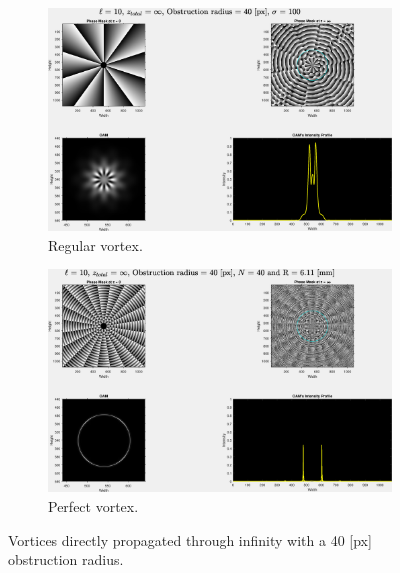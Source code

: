 \begin{figure}[htbp]
    \centering
    \begin{subfigure}[b]{0.45\textwidth}
        \centering
        \includegraphics[width=\textwidth]{images/c04/type=0_r=40_zi=0_zf=Inf.eps}
        \caption{Regular vortex.}
    \end{subfigure}
    \hfill
    \begin{subfigure}[b]{0.45\textwidth}
        \centering
        \includegraphics[width=\textwidth]{images/c04/type=1_r=40_zi=0_zf=Inf.eps}
        \caption{Perfect vortex.}
    \end{subfigure}
    \caption{Vortices directly propagated through infinity with a 40 [px] obstruction radius.}
    \label{fig:Vortices_r=40_z=inf}
\end{figure}

